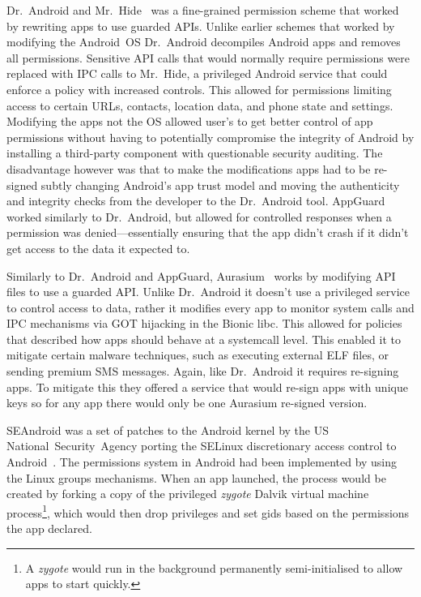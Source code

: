 \documentclass[thesis.tex]{subfiles}
\begin{document}
Dr{.}~Android and Mr{.}~Hide~\cite{jeon_dr._2012} was a fine-grained
permission scheme that worked by rewriting apps to use guarded APIs.
Unlike earlier schemes that worked by modifying the Android~OS
Dr{.}~Android decompiles Android apps and removes all permissions.
Sensitive API calls that would normally require permissions were
replaced with IPC calls to Mr{.}~Hide, a privileged Android service
that could enforce a policy with increased controls.  This allowed for
permissions limiting access to certain URLs, contacts, location data,
and phone state and settings.  Modifying the apps not the OS allowed
user's to get better control of app permissions without having to
potentially compromise the integrity of Android by installing a
third-party component with questionable security auditing. The
disadvantage however was that to make the modifications apps had to be
re-signed subtly changing Android's app trust model and moving the
authenticity and integrity checks from the developer to the
Dr{.}~Android tool.  AppGuard~\cite{backes_appguard_2013} worked
similarly to Dr{.}~Android, but allowed for controlled responses when
a permission was denied---essentially ensuring that the app didn't
crash if it didn't get access to the data it expected to.

Similarly to Dr{.}~Android and AppGuard, Aurasium~\cite{xu_aurasium:_2012} works by
modifying API files to use a guarded API.  Unlike Dr{.}~Android it
doesn't use a privileged service to control access to data, rather it
modifies every app to monitor system calls and IPC mechanisms via GOT
hijacking in the Bionic libc.  This allowed for policies that
described how apps should behave at a systemcall level.  This enabled
it to mitigate certain malware techniques, such as executing external
ELF files, or sending premium SMS messages.  Again, like Dr{.}~Android
it requires re-signing apps.  To mitigate this they offered a service
that would re-sign apps with unique keys so for any app there would
only be one Aurasium re-signed version.

SEAndroid was a set of patches to the Android kernel by the US
National~Security~Agency porting the SELinux discretionary access
control to Android~\cite{smalley_security_2013}.  The permissions
system in Android had been implemented by using the Linux groups
mechanisms.  When an app launched, the process would be created by
forking a copy of the privileged \emph{zygote} Dalvik virtual machine
process\footnote{A \emph{zygote} would run in the background permanently
semi-initialised to allow apps to start quickly.}, which would then
drop privileges and set gids based on the permissions the app declared.
\end{document}
